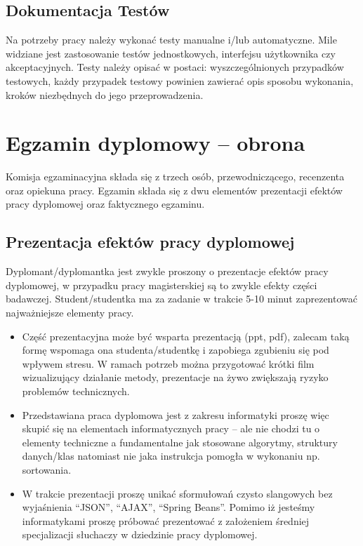 \documentclass[12pt,a4paper]{article}
\begin{document}
\subsection{Dokumentacja Testów}

Na potrzeby pracy należy wykonać testy manualne i/lub automatyczne. Mile widziane jest zastosowanie testów jednostkowych, interfejsu użytkownika czy akceptacyjnych. Testy należy opisać w postaci: wyszczególnionych przypadków testowych, każdy przypadek testowy powinien zawierać opis sposobu wykonania, kroków niezbędnych do jego przeprowadzenia.


\section{Egzamin dyplomowy -- obrona}

Komisja egzaminacyjna składa się z trzech osób, przewodniczącego, recenzenta oraz opiekuna pracy. Egzamin składa się z dwu elementów prezentacji efektów pracy dyplomowej oraz faktycznego egzaminu.

\subsection{Prezentacja efektów pracy dyplomowej}
Dyplomant/dyplomantka jest zwykle proszony o prezentacje efektów pracy dyplomowej, w przypadku pracy magisterskiej są to zwykle efekty części badawczej. Student/studentka ma za zadanie w trakcie 5-10 minut zaprezentować najważniejsze elementy pracy.

\begin{itemize}
\item Część prezentacyjna może być wsparta prezentacją (ppt, pdf), zalecam taką formę wspomaga ona studenta/studentkę i zapobiega zgubieniu się pod wpływem stresu. W ramach potrzeb można przygotować krótki film wizualizujący działanie metody, prezentacje na żywo zwiększają ryzyko problemów technicznych.

\item Przedstawiana praca dyplomowa jest z zakresu informatyki proszę więc skupić się na elementach informatycznych pracy -- ale nie chodzi tu o elementy techniczne a fundamentalne jak stosowane algorytmy, struktury danych/klas natomiast nie jaka instrukcja pomogła w wykonaniu np. sortowania.

\item W trakcie prezentacji proszę unikać sformułowań czysto slangowych bez wyjaśnienia ``JSON'', ``AJAX'', ``Spring Beans''. Pomimo iż jesteśmy informatykami proszę próbować prezentować z założeniem średniej specjalizacji słuchaczy w dziedzinie pracy dyplomowej.
\end{itemize}
\end{document}
